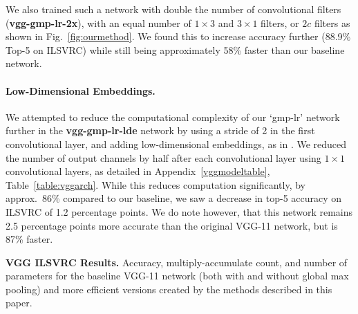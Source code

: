 \documentclass[thesis]{subfiles}
\begin{document}
    We also trained such a network with double the number of convolutional filters (\textbf{vgg-gmp-lr-2x}), \ie with an equal number of $1 \times 3$ and $3 \times 1$ filters, or $2c$ filters as shown in Fig.~\ref{fig:ourmethod}. We found this to increase accuracy further (88.9\% Top-5 on ILSVRC) while still being approximately 58\% faster than our baseline network.
    
    \paragraph{Low-Dimensional Embeddings.}
    We attempted to reduce the computational complexity of our `gmp-lr' network further in the \textbf{vgg-gmp-lr-lde} network by using a stride of 2 in the first convolutional layer, and adding low-dimensional embeddings, as in \citet{journals/corr/LinCY13,journals/corr/SzegedyLJSRAEVR14}. We reduced the number of output channels by half after each convolutional layer using $1 \times 1$ convolutional layers, as detailed in Appendix~\ref{vggmodeltable}, Table~\ref{table:vggarch}. While this reduces computation significantly, by approx.~86\% compared to our baseline, we saw a decrease in top-5 accuracy on ILSVRC of 1.2 percentage points. We do note however, that this network remains 2.5 percentage points more accurate than the original VGG-11 network, but is 87\% faster.
    
    \begin{table}[htb]
        \centering
        \data
        \pgfplotstabletypeset[
        every head row/.style={
            before row=\toprule,after row=\midrule},
        every last row/.style={
            after row=\bottomrule},
        every first row/.style={
            after row=\bottomrule},
        fixed zerofill,     %
        columns={Network, Stride, Multiply-Acc., Param., Top-1 Acc., Top-5 Acc.},
        column type/.add={lrrrrrr}{},
        columns/Multiply-Acc./.style={
            column name=Multiple-Acc. {\small $\times 10^{9}$},
            preproc/expr={{##1/1e9}}
        },
        columns/Param./.style={
            column name=Param. {\small $\times 10^{7}$},
            preproc/expr={{##1/1e7}}
        },
        columns/Network/.style={string type},
        columns/Stride/.style={precision=0},
        columns/Top-1 Acc./.style={precision=3},
        columns/Top-5 Acc./.style={precision=3},
        highlight col max ={\data}{Top-1 Acc.},
        highlight col max ={\data}{Top-5 Acc.},
        highlight col min ={\data}{Param.},
        highlight col min ={\data}{Multiply-Acc.},
        col sep=comma]{\data}
        \caption[VGG ILSVRC Results]{{\bf VGG ILSVRC Results.} Accuracy, multiply-accumulate count, and number of parameters for the baseline VGG-11 network (both with and without global max pooling) and more efficient versions created by the methods described in this paper.}
        \label{table:vggimagenetresults}
    \end{table}
    
\end{document}
